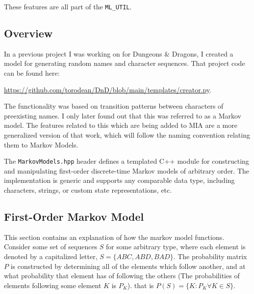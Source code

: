 These features are all part of the \texttt{ML\_UTIL}.

\subsection{Overview}

In a previous project I was working on for Dungeons \& Dragons, I created a model for generating random names and character sequences. That project code can be found here: 
\begin{center}
\url{https://github.com/torodean/DnD/blob/main/templates/creator.py}. 
\end{center}
The functionality was based on transition patterns between characters of preexisting names. I only later found out that this was referred to as a Markov model. The features related to this which are being added to MIA are a more generalized version of that work, which will follow the naming convention relating them to Markov Models.

The \texttt{MarkovModels.hpp} header defines a templated C++ module for constructing and manipulating first-order discrete-time Markov models of arbitrary order. The implementation is generic and supports any comparable data type, including characters, strings, or custom state representations, etc.

\subsection{First-Order Markov Model}

This section contains an explanation of how the markov model functions. Consider some set of sequences $S$ for some arbitrary type, where each element is denoted by a capitalized letter, $S=\{ABC, ABD, BAD\}$. The probability matrix $P$ is constructed by determining all of the elements which follow another, and at what probability that element has of following the others (The probabilities of elements following some element $K$ is $P_K$). that is $P(S) = \{K:P_K \forall K \in S\}$.

